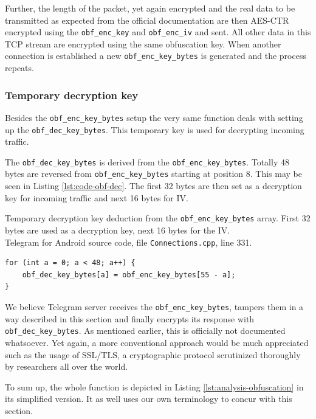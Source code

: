 \documentclass[thesis=M,english]{FITthesis}[2012/10/20]
\begin{document}
Further, the length of the packet, yet again encrypted and the real data to be transmitted as expected from the official documentation are then AES-CTR encrypted using the \texttt{obf\_enc\_key} and \texttt{obf\_enc\_iv} and sent. All other data in this TCP stream are encrypted using the same obfuscation key. When another connection is established a new \texttt{obf\_enc\_key\_bytes} is generated and the process repeats.

\subsubsection{Temporary decryption key}

Besides the \texttt{obf\_enc\_key\_bytes} setup the very same function deals with setting up the \texttt{obf\_dec\_key\_bytes}. This temporary key is used for decrypting incoming traffic.

The \texttt{obf\_dec\_key\_bytes} is derived from the \texttt{obf\_enc\_key\_bytes}. Totally 48 bytes are reversed from \texttt{obf\_enc\_key\_bytes} starting at position 8. This may be seen in Listing \ref{lst:code-obf-dec}. The first 32 bytes are then set as a decryption key for incoming traffic and next 16 bytes for IV.

\begin{listing}[htb]
\caption{Temporary decryption key deduction from the \texttt{obf\_enc\_key\_bytes} array. First 32 bytes are used as a decryption key, next 16 bytes for the IV.
\protect \\ Telegram for Android source code, file \texttt{Connections.cpp}, line 331.}
\label{lst:code-obf-dec}
\begin{verbatim}
for (int a = 0; a < 48; a++) {
    obf_dec_key_bytes[a] = obf_enc_key_bytes[55 - a];
}
\end{verbatim}
\end{listing}


We believe Telegram server receives the \texttt{obf\_enc\_key\_bytes}, tampers them in a way described in this section and finally encrypts its response with \texttt{obf\_dec\_key\_bytes}. As mentioned earlier, this is officially not documented whatsoever. Yet again, a more conventional approach would be much appreciated such as the usage of SSL/TLS, a cryptographic protocol scrutinized thoroughly by researchers all over the world.

To sum up, the whole function is depicted in Listing \ref{lst:analysis-obfuscation} in its simplified version. It as well uses our own terminology to concur with this section.
\end{document}
